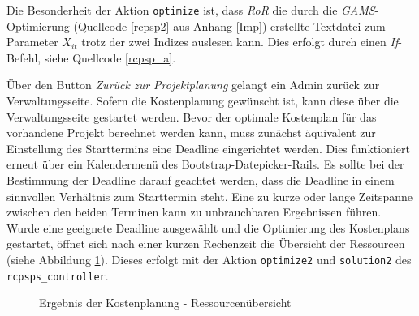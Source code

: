 \documentclass[a4paper,12pt,parskip,bibtotoc,liststotoc]{article}
\begin{document}
Die Besonderheit der Aktion \texttt{optimize} ist, dass \textit{RoR} die durch die \textit{GAMS}-Optimierung (Quellcode \ref{rcpsp2} aus Anhang \ref{Imp}) erstellte Textdatei zum Parameter $X_{it}$ trotz der zwei Indizes auslesen kann. Dies erfolgt durch einen \textit{If}-Befehl, siehe Quellcode \ref{rcpsp_a}. %



Über den Button \textit{Zurück zur Projektplanung} gelangt ein Admin zurück zur Verwaltungsseite. Sofern die Kostenplanung gewünscht ist, kann diese über die Verwaltungsseite gestartet werden. Bevor der optimale Kostenplan für das vorhandene Projekt berechnet werden kann, muss zunächst äquivalent zur Einstellung des Starttermins eine Deadline eingerichtet werden. Dies funktioniert erneut über ein Kalendermenü des \glqq Bootstrap-Datepicker-Rails\grqq. Es sollte bei der Bestimmung der Deadline darauf geachtet werden, dass die Deadline in einem sinnvollen Verhältnis zum Starttermin steht. Eine zu kurze oder lange Zeitspanne zwischen den beiden Terminen kann zu unbrauchbaren Ergebnissen führen. Wurde eine geeignete Deadline ausgewählt und die Optimierung des Kostenplans gestartet, öffnet sich nach einer kurzen Rechenzeit die Übersicht der Ressourcen (siehe Abbildung \ref{ResKo}). Dieses erfolgt mit der Aktion \texttt{optimize2} und \texttt{solution2} des \texttt{rcpsps\_controller}.\\

\begin{figure}[h!]
  \begin{center}
    \caption{Ergebnis der Kostenplanung - Ressourcenübersicht}  \label{ResKo}
  \end{center}
\end{figure}
\end{document}
